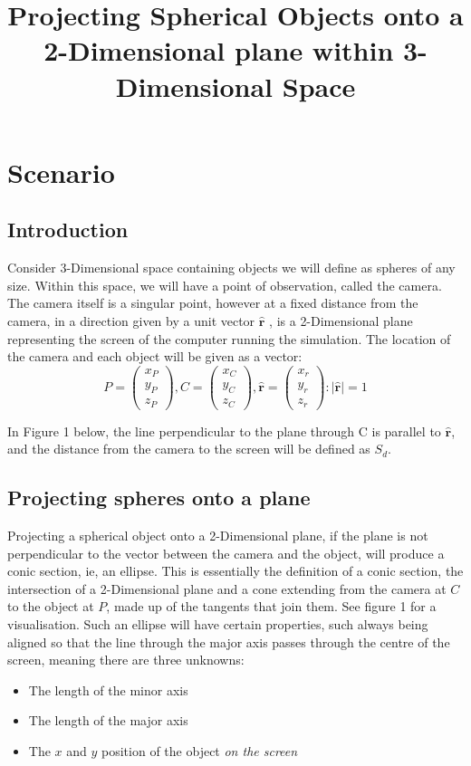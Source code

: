 \documentclass{article}
\title{Projecting Spherical Objects onto a 2-Dimensional plane within 3-Dimensional Space}
\date{}
\newcommand\dd{{2-Dimensional}\xspace}
\newcommand\ddd{{3-Dimensional}\xspace}
\newcommand\ru{\hat{\mathbf{r}}\xspace}
\begin{document}
\maketitle
\section{Scenario}

	\subsection{Introduction}
	Consider \ddd space containing objects we will define as spheres of any size. Within this space, we will have a point of 
	observation, called the camera. The camera itself is a singular point, however at a fixed distance from the camera, in a direction given by a
	unit vector $\ru$ , is a \dd plane 
	representing the screen of the computer running the simulation. The location of the camera and each object will be given as a vector:
	$$P = \begin{pmatrix}x_P\\y_P\\z_P\end{pmatrix}, C = \begin{pmatrix}x_C\\y_C\\z_C\end{pmatrix}, \hat{\mathbf{r}} = \begin{pmatrix}x_r\\y_r\\z_r\end{pmatrix}:|\ru|=1$$
	

	In Figure 1 below, the line perpendicular to the plane through C is parallel to $\ru$, and the distance from the camera to the screen will be
	defined as $S_d$.
	\subsection{Projecting spheres onto a plane}
	Projecting a spherical object onto a \dd plane, if the plane is not perpendicular to the vector between the camera and the object, 
	will produce a conic section, ie, an ellipse. This is essentially the definition of a conic section, the intersection of a \dd plane and a cone 
	extending from the camera at $C$ to the object at $P$, made up of the tangents that join them. See figure 1 for a visualisation.
	Such an ellipse will have certain properties, such always being aligned so that the line through the major axis passes through the centre of 
	the screen, meaning there are three unknowns:
	\begin{itemize}
		\item The length of the minor axis
		\item The length of the major axis
		\item The $x$ and $y$ position of the object \textit{on the screen}
	\end{itemize}
	
\end{document}

